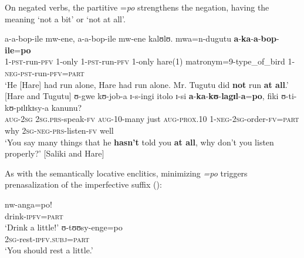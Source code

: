 On negated verbs, the partitive =\textit{po} strengthens the negation, having the meaning \lq not a bit' or \lq not at all'.
\begin{exe}
	\ex \gll a-a-bop-ile mw-ene, a-a-bop-ile mw-ene kalʊlʊ. mwa=n-dugutu \textbf{a}-\textbf{ka}-\textbf{a}-\textbf{bop}-\textbf{ile}=\textbf{po}\\
	1-\textsc{pst}-run-\textsc{pfv} 1-only 1-\textsc{pst}-run-\textsc{pfv} 1-only hare(1) matronym=9-type\_of\_bird 1-\textsc{neg}-\textsc{pst}-run-\textsc{pfv}=\textsc{part}\\
	\glt `He [Hare] had run alone, Hare had run alone. Mr. Tugutu did \textbf{not} run \textbf{at all}.' [Hare and Tugutu]
	\ex \gll ʊ-gwe kʊ-job-a ɪ-s-ingi itolo ɪ-si \textbf{a}-\textbf{ka}-\textbf{kʊ}-\textbf{lagɪl}-\textbf{a}=\textbf{po}, fiki ʊ-ti-kʊ-pɪlɪkɪsy-a kanunu?\\
	\textsc{aug}-\textsc{2sg} \textsc{2sg.prs}-speak-\textsc{fv} \textsc{aug}-10-many just \textsc{aug}-\textsc{prox.10} 1-\textsc{neg}-\textsc{2sg}-order-\textsc{fv}=\textsc{part} why \textsc{2sg}-\textsc{neg}-\textsc{prs}-listen-\textsc{fv} well\\
	\glt `‎‎You say many things that he \textbf{hasn't} told you \textbf{at all}, why don't you listen properly?' [Saliki and Hare]
\end{exe}

As with the semantically locative enclitics, minimizing \textit{=po} triggers prenasalization of the imperfective suffix ():
\begin{exe}
	\ex 
	\begin{xlist}
		\ex \gll nw-anga=po!\\
		drink-\textsc{ipfv}=\textsc{part}\\
		\glt `Drink a little!'
		\ex \gll ʊ-tʊʊsy-enge=po\\
		\textsc{2sg}-rest-\textsc{ipfv.subj}=\textsc{part}\\
		\glt `You should rest a little.'
	\end{xlist}
\end{exe}


